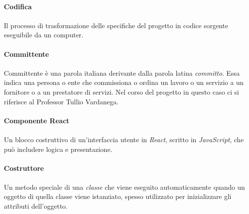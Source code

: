 \documentclass[10pt, a4paper]{article}
\begin{document}
\paragraph{Codifica}\noindent\hrulefill
\paragraph{}Il processo di trasformazione delle specifiche del progetto in codice sorgente eseguibile da un computer.


\vspace{2em}
\paragraph{Committente}\noindent\hrulefill
\paragraph{}Committente è una parola italiana derivante dalla parola latina \textit{committo}. Essa indica una persona o ente che commissiona o ordina un lavoro o un servizio a un fornitore o a un prestatore di
servizi. Nel corso del progetto in questo caso ci si riferisce al Professor Tullio Vardanega.

\vspace{2em}
\paragraph{Componente React}\noindent\hrulefill
\paragraph{}Un blocco costruttivo di un'interfaccia utente in \textit{React\pg}, scritto in \textit{JavaScript\pg}, che può includere logica e presentazione.


\vspace{2em}
\paragraph{Costruttore}\noindent\hrulefill
\paragraph{}Un metodo speciale di una \textit{classe\pg} che viene eseguito automaticamente quando un oggetto di quella classe viene istanziato, spesso utilizzato per inizializzare gli attributi dell'oggetto.

\vspace{2em}
\end{document}
